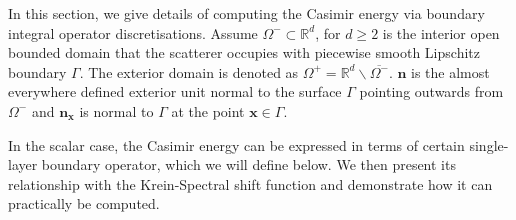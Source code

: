 
In this section, we give details of computing the Casimir energy via boundary integral operator discretisations. 
Assume 
$\Omega^{-}\subset \mathbb{R}^{d}$, for $d \geq 2$ is the interior open bounded domain that the scatterer occupies with piecewise smooth Lipschitz boundary $\Gamma$. The exterior domain is denoted as 
$\Omega^{+} = \mathbb{R}^{d}\backslash\overline{\Omega^{-}}$. $\boldsymbol{n}$ is the almost everywhere defined exterior unit normal to the surface $\Gamma$ pointing outwards from $\Omega^{-}$ and 
$\boldsymbol{n}_{\boldsymbol{x}}$ is normal to $\Gamma$ at the point $\boldsymbol{x}\in\Gamma$.

In the scalar case, the Casimir energy can be expressed in terms of certain single-layer boundary operator, which we will define below. We then present its relationship with the Krein-Spectral shift function and demonstrate how it can practically be computed.

